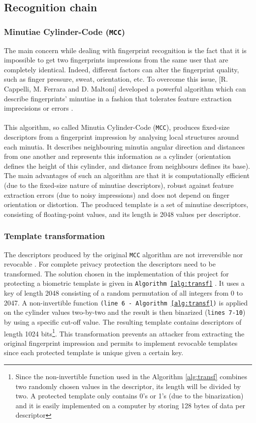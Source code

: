 \documentclass[a4paper,12pt]{article}
\begin{document}
\subsection{Recognition chain}
\subsubsection{Minutiae Cylinder-Code (\texttt{MCC})}
The main concern while dealing with fingerprint recognition is the fact that it is impossible to get two fingerprints impressions from the same user that are completely identical. Indeed, different factors can alter the fingerprint quality, such as finger pressure, sweat, orientation, etc. To overcome this issue, [R. Cappelli, M. Ferrara and D. Maltoni] developed a powerful algorithm which can describe fingerprints' minutiae in a fashion that tolerates feature extraction imprecisions or errors \cite{mcc:2010}.
\\\\
This algorithm, so called Minutia Cylinder-Code (\texttt{MCC}), produces fixed-size descriptors from a fingerprint impression by analysing local structures around each minutia. It describes neighbouring minutia angular direction and distances from one another and represents this information as a cylinder (orientation defines the height of this cylinder, and distance from neighbours defines its base). The main advantages of such an algorithm are that it is computationally efficient (due to the fixed-size nature of minutiae descriptors), robust against feature extraction errors (due to noisy impressions) and does not depend on finger orientation or distortion. The produced template is a set of minutiae descriptors, consisting of floating-point values, and its length is 2048 values per descriptor.

\subsubsection{Template transformation}
The descriptors produced by the original \texttt{MCC} algorithm are not irreversible \cite{cancel:2011} nor revocable \cite{MD13}. For complete privacy protection the descriptors need to be transformed. The solution chosen in the implementation of this project for protecting a biometric template is given in \texttt{Algorithm \ref{alg:transf}} \cite{MD13}. It uses a key of length 2048 consisting of a random permutation of all integers from 0 to 2047. A non-invertible function \texttt{(line 6 - Algorithm \ref{alg:transf})} is applied on the cylinder values two-by-two and the result is then binarized (\texttt{lines 7-10}) by using a specific cut-off value. The resulting template contains descriptors of length 1024 bits\footnote{Since the non-invertible function used in the Algorithm \ref{alg:transf} combines two randomly chosen values in the descriptor, its length will be divided by two. A protected template only contains 0's or 1's (due to the binarization) and it is easily implemented on a computer by storing 128 bytes of data per descriptor}. This transformation prevents an attacker from extracting the original fingerprint impression and permits to implement revocable templates since each protected template is unique given a certain key.
\end{document}
